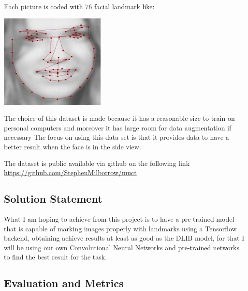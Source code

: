 \documentclass[11pt]{article}
\begin{document}
Each picture is coded with 76 facial landmark like:
\begin{center}
\includegraphics[width=.9\linewidth]{./images/landmarks.jpg}
\end{center}

The choice of this dataset is made because it has a reasonable size to train
on personal computers and moreover it has large room for data augmentation
if necessary
The focus on using this data set is that it provides data
to have a better result when the face is in the side view.


The dataset is public available via github on the following link
\url{https://github.com/StephenMilborrow/muct}

\subsection{Solution Statement}
\label{sec:org9c1b393}

What I am hoping to achieve from this project is to have a pre trained model that is capable
of marking images properly with landmarks using a Tensorflow  backend, obtaining 
achieve results at least as good as the DLIB model, for that I will be using
our own Convolutional Neural Networks and pre-trained networks to find the best
result for the task.

\subsection{Evaluation and Metrics}
\label{sec:orgc329deb}
\end{document}
